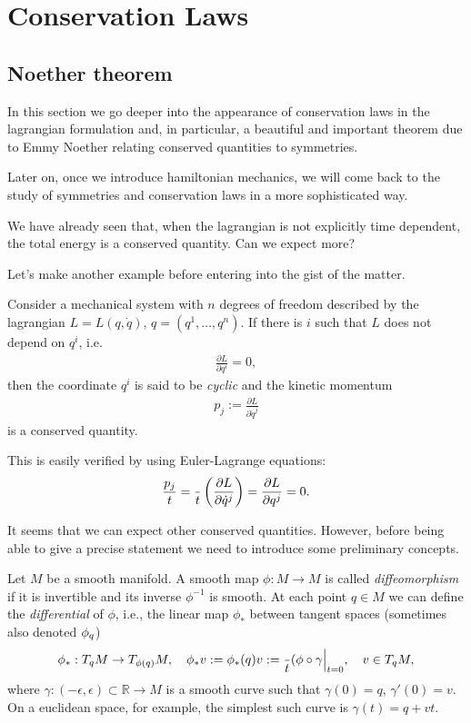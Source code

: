 \documentclass[english,fontsize=11pt,paper=a5,oneside]{scrbook}
\newcommand{\R}{\mathbb{R}}
\let\d\relax
\newcommand{\d}{\mathrm{d}}
\theoremstyle{definition}
\newenvironment{example}
  {\pushQED{\qed}\renewcommand{\qedsymbol}{$\lozenge$}\examplex}
  {\popQED\endexamplex}
\begin{document}
\chapter{Conservation Laws}

\section{Noether theorem}

In this section we go deeper into the appearance of conservation laws in the lagrangian formulation and, in particular, a beautiful and important theorem due to Emmy Noether relating conserved quantities to symmetries.

Later on, once we introduce hamiltonian mechanics, we will come back to the study of symmetries and conservation laws in a more sophisticated way.

We have already seen that, when the lagrangian is not explicitly time dependent, the total energy is a conserved quantity.
Can we expect more?

Let's make another example before entering into the gist of the matter.

\begin{example}[kinetic momentum]\label{ex:linearm}
  Consider a mechanical system with $n$ degrees of freedom described by the lagrangian $L=L(q,\dot q)$, $q=(q^1,\ldots,q^n)$.
  If there is $i$ such that $L$ does not depend on $q^i$, i.e.
  \begin{eqnarray}
    \frac{\partial L}{\partial q^i} = 0,
  \end{eqnarray}
  then the coordinate $q^i$ is said to be \emph{cyclic} and the kinetic momentum
  \begin{eqnarray}
    p_j := \frac{\partial L}{\partial\dot q^j}
  \end{eqnarray}
  is a conserved quantity.

  This is easily verified by using Euler-Lagrange equations:
  \begin{eqnarray}
    \frac{\d p_j}{\d t} =
    \frac{\d}{\d t} \left(\frac{\partial L}{\partial \dot q^j}\right)=
    \frac{\partial L}{\partial q^j} = 0.
  \end{eqnarray}
\end{example}

It seems that we can expect other conserved quantities. However, before being able to give a precise statement we need to introduce some preliminary concepts.

Let $M$ be a smooth manifold. A smooth map $\phi : M \to M$ is called \emph{diffeomorphism} if it is invertible and its inverse $\phi^{-1}$ is smooth. At each point $q\in M$ we can define the \emph{differential} of $\phi$, i.e., the linear map $\phi_*$ between tangent spaces (sometimes also denoted $\d\phi_q$)
\begin{equation}
  \phi_*: T_q M \to T_{\phi(q)} M,
  \quad \phi_* v := \phi_*(q) v := \frac{\d}{\d t} (\phi \circ \gamma \Big|_{t=0},
  \quad v\in T_q M,
\end{equation}
where $\gamma:(-\epsilon, \epsilon)\subset\R \to M$ is a smooth curve such that $\gamma(0)=q$, $\gamma'(0) = v$.
On a euclidean space, for example, the simplest such curve is $\gamma(t) = q + v t$.
\end{document}
